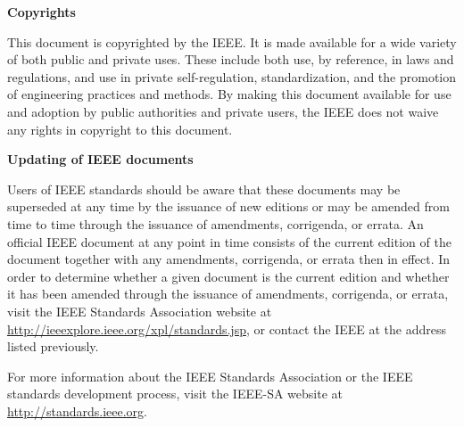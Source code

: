{\vspace{17pt}
{\fmsans\bfseries\fontsize{11}{13}\selectfont Copyrights\par}
\vspace{12.5pt}
This document is copyrighted by the IEEE. It is made available for a wide variety of both public and private uses. These include both use, by reference, in laws and regulations, and use in private self-regulation, standardization, and the promotion of engineering practices and methods. By making this document available for use and adoption by public authorities and private users, the IEEE does not waive any rights in copyright to this document.\par
\vspace{17pt}
{\fmsans\bfseries\fontsize{11}{13}\selectfont Updating of IEEE documents\par}
\vspace{12.5pt}
Users of IEEE standards should be aware that these documents may be superseded at any time by the issuance of new editions or may be amended from time to time through the issuance of amendments, corrigenda, or errata. An official IEEE document at any point in time consists of the current edition of the document together with any amendments, corrigenda, or errata then in effect. In order to determine whether a given document is the current edition and whether it has been amended through the issuance of amendments, corrigenda, or errata, visit the IEEE Standards Association website at \url{http://ieeexplore.ieee.org/xpl/standards.jsp}, or contact the IEEE at the address listed previously.\par
\vspace{11pt}
For more information about the IEEE Standards Association or the IEEE standards development process, visit the IEEE-SA website at \url{http://standards.ieee.org}.\par
}
\newpage


